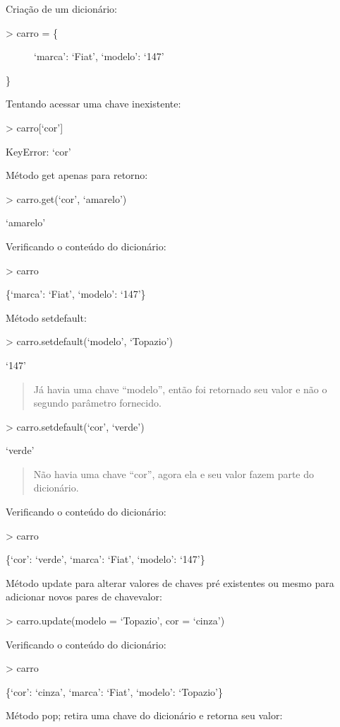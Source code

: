 \documentclass[letterpaper,10pt,brazil]{sphinxmanual}
\begin{document}
Criação de um dicionário:
\begin{description}
\item[{\textgreater{} carro = \{}] \leavevmode
‘marca’: ‘Fiat’,
‘modelo’: ‘147’

\end{description}

\}

Tentando acessar uma chave inexistente:

\textgreater{} carro{[}‘cor’{]}

KeyError: ‘cor’

Método get apenas para retorno:

\textgreater{} carro.get(‘cor’, ‘amarelo’)

‘amarelo’

Verificando o conteúdo do dicionário:

\textgreater{} carro

\{‘marca’: ‘Fiat’, ‘modelo’: ‘147’\}

Método setdefault:

\textgreater{} carro.setdefault(‘modelo’, ‘Topazio’)

‘147’
\begin{quote}

Já havia uma chave “modelo”, então foi retornado seu valor e não o segundo parâmetro fornecido.
\end{quote}

\textgreater{} carro.setdefault(‘cor’, ‘verde’)

‘verde’
\begin{quote}

Não havia uma chave “cor”, agora ela e seu valor fazem parte do dicionário.
\end{quote}

Verificando o conteúdo do dicionário:

\textgreater{} carro

\{‘cor’: ‘verde’, ‘marca’: ‘Fiat’, ‘modelo’: ‘147’\}

Método update para alterar valores de chaves pré existentes ou mesmo para adicionar novos pares de chave\sphinxhyphen{}valor:

\textgreater{} carro.update(modelo = ‘Topazio’, cor = ‘cinza’)

Verificando o conteúdo do dicionário:

\textgreater{} carro

\{‘cor’: ‘cinza’, ‘marca’: ‘Fiat’, ‘modelo’: ‘Topazio’\}

Método pop; retira uma chave do dicionário e retorna seu valor:
\end{document}
